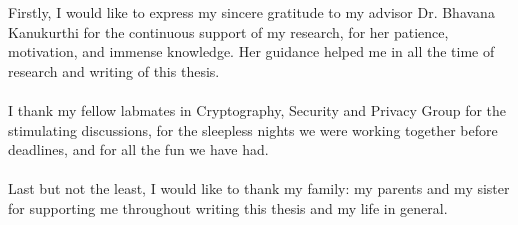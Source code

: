 Firstly, I would like to express my sincere gratitude to my advisor Dr. Bhavana Kanukurthi for the continuous support of my research, for her patience, motivation, and immense knowledge. Her guidance helped me in all the time of research and writing of this thesis.
\\ \\
I thank my fellow labmates in Cryptography, Security and Privacy Group for the stimulating discussions, for the sleepless nights we were working together before deadlines, and for all the fun we have had.
\\ \\
Last but not the least, I would like to thank my family: my parents and my sister for supporting me throughout writing this thesis and my life in general.